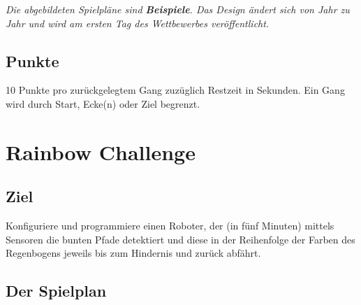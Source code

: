 \documentclass[a4paper,12pt]{article}
\begin{document}
\emph{Die abgebildeten Spielpläne sind \textbf{Beispiele}. Das Design ändert sich von Jahr zu
Jahr und wird am ersten Tag des Wettbewerbes veröffentlicht.}

\subsection{Punkte}

10 Punkte pro zurückgelegtem Gang zuzüglich Restzeit in Sekunden.
Ein Gang wird durch Start, Ecke(n) oder Ziel begrenzt.

\section{Rainbow Challenge}

\subsection{Ziel}

Konfiguriere und programmiere einen Roboter, der (in fünf Minuten) mittels
Sensoren die bunten Pfade detektiert und diese in der Reihenfolge der Farben
des Regenbogens jeweils bis zum Hindernis und zurück abfährt.

\subsection{Der Spielplan}
\end{document}
